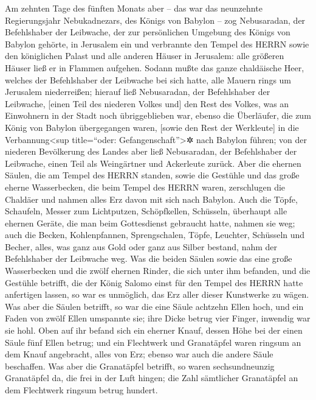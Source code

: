 Am zehnten Tage des fünften Monats aber -- das war das
neunzehnte Regierungsjahr Nebukadnezars, des Königs von Babylon -- zog
Nebusaradan, der Befehlshaber der Leibwache, der zur persönlichen
Umgebung des Königs von Babylon gehörte, in Jerusalem ein
und verbrannte den Tempel des HERRN sowie den königlichen
Palast und alle anderen Häuser in Jerusalem: alle größeren Häuser ließ
er in Flammen aufgehen. Sodann mußte das ganze
chaldäische Heer, welches der Befehlshaber der Leibwache bei sich hatte,
alle Mauern rings um Jerusalem niederreißen; hierauf ließ
Nebusaradan, der Befehlshaber der Leibwache, {[}einen Teil des niederen
Volkes und{]} den Rest des Volkes, was an Einwohnern in der Stadt noch
übriggeblieben war, ebenso die Überläufer, die zum König von Babylon
übergegangen waren, {[}sowie den Rest der Werkleute{]} in die
Verbannung\textless sup title=``oder: Gefangenschaft''\textgreater✲ nach
Babylon führen; von der niederen Bevölkerung des Landes
aber ließ Nebusaradan, der Befehlshaber der Leibwache, einen Teil als
Weingärtner und Ackerleute zurück. Aber die ehernen
Säulen, die am Tempel des HERRN standen, sowie die Gestühle und das
große eherne Wasserbecken, die beim Tempel des HERRN waren, zerschlugen
die Chaldäer und nahmen alles Erz davon mit sich nach Babylon.
Auch die Töpfe, Schaufeln, Messer zum Lichtputzen,
Schöpfkellen, Schüsseln, überhaupt alle ehernen Geräte, die man beim
Gottesdienst gebraucht hatte, nahmen sie weg; auch die
Becken, Kohlenpfannen, Sprengschalen, Töpfe, Leuchter, Schüsseln und
Becher, alles, was ganz aus Gold oder ganz aus Silber bestand, nahm der
Befehlshaber der Leibwache weg. Was die beiden Säulen
sowie das eine große Wasserbecken und die zwölf ehernen Rinder, die sich
unter ihm befanden, und die Gestühle betrifft, die der König Salomo
einst für den Tempel des HERRN hatte anfertigen lassen, so war es
unmöglich, das Erz aller dieser Kunstwerke zu wägen. Was
aber die Säulen betrifft, so war die eine Säule achtzehn Ellen hoch, und
ein Faden von zwölf Ellen umspannte sie; ihre Dicke betrug vier Finger,
inwendig war sie hohl. Oben auf ihr befand sich ein
eherner Knauf, dessen Höhe bei der einen Säule fünf Ellen betrug; und
ein Flechtwerk und Granatäpfel waren ringsum an dem Knauf angebracht,
alles von Erz; ebenso war auch die andere Säule beschaffen. Was aber die
Granatäpfel betrifft, so waren sechsundneunzig
Granatäpfel da, die frei in der Luft hingen; die Zahl sämtlicher
Granatäpfel an dem Flechtwerk ringsum betrug hundert.

